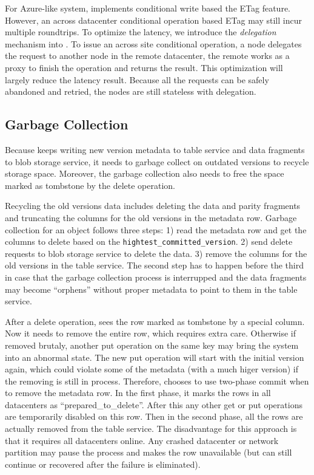For Azure-like system, {\name} implements conditional write based the ETag feature.
However, an across datacenter conditional operation based ETag may still incur multiple
roundtrips. To optimize the latency, we introduce the \emph{delegation} mechanism
into {\name}. To issue an across site conditional operation, a {\name} node delegates the
request to another {\name} node in the remote datacenter, the remote {\name} works as
a proxy to finish the operation and returns the result. This optimization will largely
reduce the latency result. Because all the requests can be safely abandoned and retried,
the {\name} nodes are still stateless with delegation.

\subsection{Garbage Collection}
Because {\name} keeps writing new version metadata to table service and data fragments
to blob storage service, it needs to garbage collect on outdated versions to recycle
storage space. Moreover, the garbage collection also needs to free the space marked as
tombstone by the delete operation.

Recycling the old versions data includes deleting the data and parity fragments and
truncating the columns for the old versions in the metadata row. Garbage collection
for an object follows three steps: 1) read the metadata row and get the columns to
delete based on the \texttt{hightest\_committed\_version}. 2) send delete requests to
blob storage service to delete the data. 3) remove the columns for the old versions
in the table service. The second step has to happen before the third in case that the
garbage collection process is interrupped and the data fragments may become ``orphens''
without proper metadata to point to them in the table service.

After a delete operation, {\name} sees the row marked as tombstone by a special column.
Now it needs to remove the entire row, which requires extra care. Otherwise if removed
brutaly, another put operation on the same key may bring the system into an abnormal
state. The new put operation will start with the initial version again, which could
violate some of the metadata (with a much higer version) if the removing is still in
process. Therefore, {\name} chooses to use two-phase commit when to remove the metadata
row. In the first phase, it marks the rows in all datacenters as ``prepared\_to\_delete''.
After this any other get or put operations are temporarily disabled on this row. Then
in the second phase, all the rows are actually removed from the table service. The
disadvantage for this approach is that it requires all datacenters online. Any crashed
datacenter or network partition may pause the process and makes the row unavailable
(but can still continue or recovered after the failure is eliminated). 


